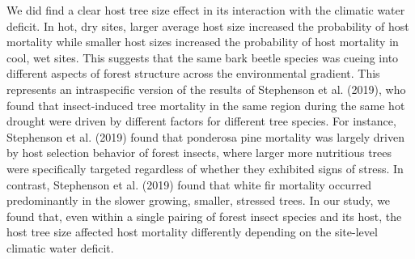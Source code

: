\documentclass[]{article}
\begin{document}
We did find a clear host tree size effect in its interaction with the
climatic water deficit. In hot, dry sites, larger average host size
increased the probability of host mortality while smaller host sizes
increased the probability of host mortality in cool, wet sites. This
suggests that the same bark beetle species was cueing into different
aspects of forest structure across the environmental gradient. This
represents an intraspecific version of the results of Stephenson et al.
(2019), who found that insect-induced tree mortality in the same region
during the same hot drought were driven by different factors for
different tree species. For instance, Stephenson et al. (2019) found
that ponderosa pine mortality was largely driven by host selection
behavior of forest insects, where larger more nutritious trees were
specifically targeted regardless of whether they exhibited signs of
stress. In contrast, Stephenson et al. (2019) found that white fir
mortality occurred predominantly in the slower growing, smaller,
stressed trees. In our study, we found that, even within a single
pairing of forest insect species and its host, the host tree size
affected host mortality differently depending on the site-level climatic
water deficit.
\end{document}

